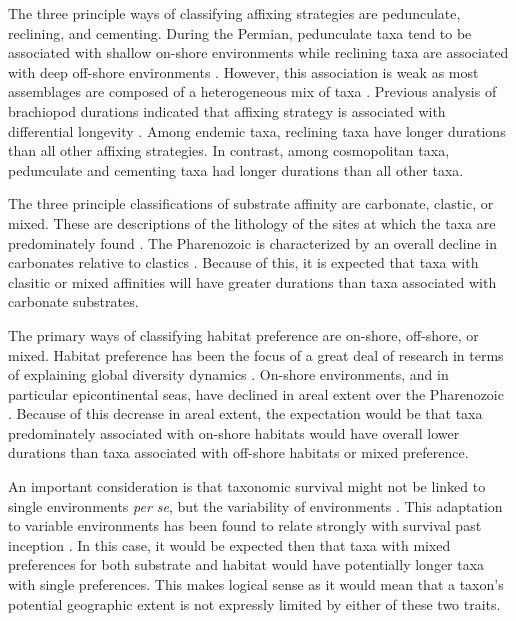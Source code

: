 \documentclass[12pt,letterpaper]{article}
\begin{document}
The three principle ways of classifying affixing strategies are pedunculate, reclining, and cementing. During the Permian, pedunculate taxa tend to be associated with shallow on-shore environments while reclining taxa are associated with deep off-shore environments \citep{Clapham2007}. However, this association is weak as most assemblages are composed of a heterogeneous mix of taxa \citep{Clapham2007}. Previous analysis of brachiopod durations indicated that affixing strategy is associated with differential longevity \citep{Alexander1977}. Among endemic taxa, reclining taxa have longer durations than all other affixing strategies. In contrast, among cosmopolitan taxa, pedunculate and cementing taxa had longer durations than all other taxa. 

The three principle classifications of substrate affinity are carbonate, clastic, or mixed. These are descriptions of the lithology of the sites at which the taxa are predominately found \citep{Foote2006,Anderson2011a,Nurnberg2013a,Kiessling2007a,Miller2001}. The Pharenozoic is characterized by an overall decline in carbonates relative to clastics \citep{Foote2006,Miller2001}. Because of this, it is expected that taxa with clasitic or mixed affinities will have greater durations than taxa associated with carbonate substrates. %

The primary ways of classifying habitat preference are on-shore, off-shore, or mixed. Habitat preference has been the focus of a great deal of research in terms of explaining global diversity dynamics \citep{Sepkoski1991,Kiessling2007a,Bottjer1988,Jablonski1991,Jablonski1983b}. On-shore environments, and in particular epicontinental seas, have declined in areal extent over the Pharenozoic \citep{Peters2008}. Because of this decrease in areal extent, the expectation would be that taxa predominately associated with on-shore habitats would have overall lower durations than taxa associated with off-shore habitats or mixed preference.

An important consideration is that taxonomic survival might not be linked to single environments \textit{per se}, but the variability of environments \citep{Foote2013,Heim2011,Liow2007b}. This adaptation to variable environments has been found to relate strongly with survival past inception \citep{Foote2013}. In this case, it would be expected then that taxa with mixed preferences for both substrate and habitat would have potentially longer taxa with single preferences. This makes logical sense as it would mean that a taxon's potential geographic extent is not expressly limited by either of these two traits. 
\end{document}
